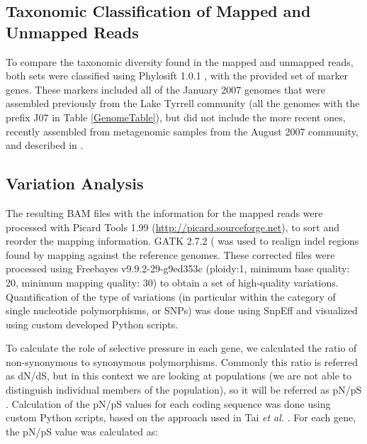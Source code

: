 \subsection{Taxonomic Classification of Mapped and Unmapped Reads}

To compare the taxonomic diversity found in the mapped and unmapped reads, both sets were classified using Phylosift 1.0.1 \cite{Darling:2014ej}, with the provided set of marker genes. These markers included all of the January 2007 genomes that were assembled previously from the Lake Tyrrell community \cite{Narasingarao:2012kp,Podell:2013kx} (all the genomes with the prefix J07 in Table \ref{GenomeTable}), but did not include the more recent ones, recently assembled from metagenomic samples from the August 2007 community, and described in \cite{Podell:2013fp}.

\subsection{Variation Analysis}

The resulting BAM files with the information for the mapped reads were processed with Picard Tools 1.99 (\url{http://picard.sourceforge.net}), to sort and reorder the mapping information. GATK 2.7.2 (\cite{DePristo:2011fo} was used to realign indel regions found by mapping against the reference genomes. These corrected files were processed using Freebayes v9.9.2-29-g9ed353c \cite{Garrison:2012wb} (ploidy:1, minimum base quality: 20, minimum mapping quality: 30) to obtain a set of high-quality variations. Quantification of the type of variations (in particular within the category of single nucleotide polymorphisms, or SNPs) was done using SnpEff \cite{Cingolani:2012cz} and visualized using custom developed Python scripts. 

To calculate the role of selective pressure in each gene, we calculated the ratio of non-synonymous to synonymous polymorphisms. Commonly this ratio is referred as dN/dS, but in this context we are looking at populations (we are not able to distinguish individual members of the population), so it will be referred as pN/pS \cite{Schloissnig:2012hx}. Calculation of the pN/pS values for each coding sequence was done using custom Python scripts, based on the approach used in Tai \textit{et al.} \cite{Tai:2011jo}. For each gene, the pN/pS value was calculated as:

\begin{center}
\end{center}

